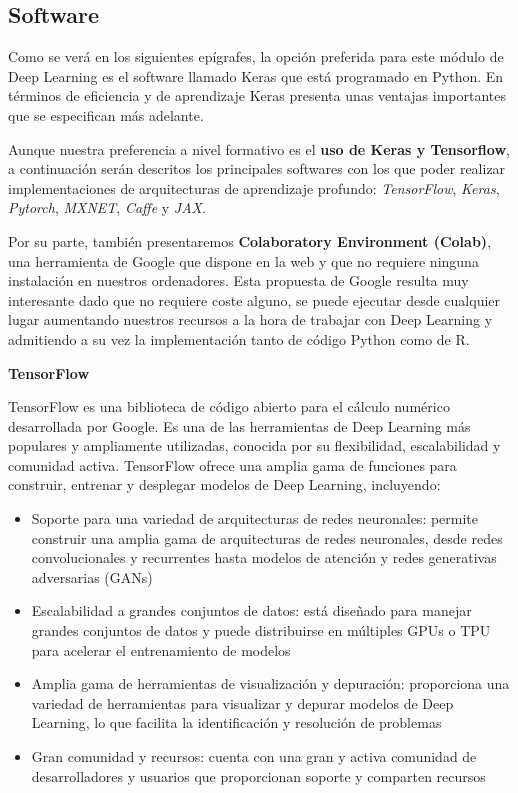 \documentclass[
  a4paper,
  DIV=11,
  numbers=noendperiod]{scrreprt}
\providecommand{\tightlist}{%
  \setlength{\itemsep}{0pt}\setlength{\parskip}{0pt}}\usepackage{longtable,booktabs,array}
\begin{document}
\subsection{Software}\label{software}

Como se verá en los siguientes epígrafes, la opción preferida para este
módulo de Deep Learning es el software llamado Keras que está programado
en Python. En términos de eficiencia y de aprendizaje Keras presenta
unas ventajas importantes que se especifican más adelante.

Aunque nuestra preferencia a nivel formativo es el \textbf{uso de Keras
y Tensorflow}, a continuación serán descritos los principales softwares
con los que poder realizar implementaciones de arquitecturas de
aprendizaje profundo: \emph{TensorFlow}, \emph{Keras}, \emph{Pytorch},
\emph{MXNET}, \emph{Caffe} y \emph{JAX}.

Por su parte, también presentaremos \textbf{Colaboratory Environment
(Colab)}, una herramienta de Google que dispone en la web y que no
requiere ninguna instalación en nuestros ordenadores. Esta propuesta de
Google resulta muy interesante dado que no requiere coste alguno, se
puede ejecutar desde cualquier lugar aumentando nuestros recursos a la
hora de trabajar con Deep Learning y admitiendo a su vez la
implementación tanto de código Python como de R.

\textbf{TensorFlow}

TensorFlow es una biblioteca de código abierto para el cálculo numérico
desarrollada por Google. Es una de las herramientas de Deep Learning más
populares y ampliamente utilizadas, conocida por su flexibilidad,
escalabilidad y comunidad activa. TensorFlow ofrece una amplia gama de
funciones para construir, entrenar y desplegar modelos de Deep Learning,
incluyendo:

\begin{itemize}
\tightlist
\item
  Soporte para una variedad de arquitecturas de redes neuronales:
  permite construir una amplia gama de arquitecturas de redes
  neuronales, desde redes convolucionales y recurrentes hasta modelos de
  atención y redes generativas adversarias (GANs)
\item
  Escalabilidad a grandes conjuntos de datos: está diseñado para manejar
  grandes conjuntos de datos y puede distribuirse en múltiples GPUs o
  TPU para acelerar el entrenamiento de modelos
\item
  Amplia gama de herramientas de visualización y depuración: proporciona
  una variedad de herramientas para visualizar y depurar modelos de Deep
  Learning, lo que facilita la identificación y resolución de problemas
\item
  Gran comunidad y recursos: cuenta con una gran y activa comunidad de
  desarrolladores y usuarios que proporcionan soporte y comparten
  recursos
\end{itemize}
\end{document}

